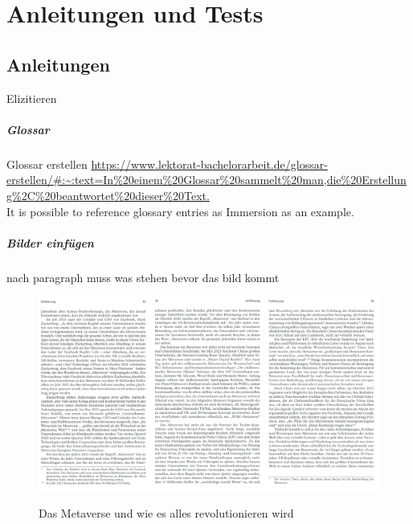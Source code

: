 \chapter{Anleitungen und Tests}\label{ch:Anleitungen}

\section{Anleitungen}

\glqq Elizitieren\grqq{}

\paragraph*{Glossar}

Glossar erstellen \url{https://www.lektorat-bachelorarbeit.de/glossar-erstellen/#:~:text=In%20einem%20Glossar%20sammelt%20man,die%20Erstellung%2C%20beantwortet%20dieser%20Text.} \\
It is possible to reference glossary entries as \gls{Immersion} as an example.

\paragraph{Bilder einfügen}
nach paragraph muss was stehen bevor das bild kommt

\begin{figure}[!h]
    \centering
\includegraphics[width = 15cm]{figures/Das_Metaverse_uwearw13-15.png}
\caption{Das Metaverse und wie es alles revolutionieren wird}
\cite{Ball22}
\label{fig:testbild}
\end{figure}



